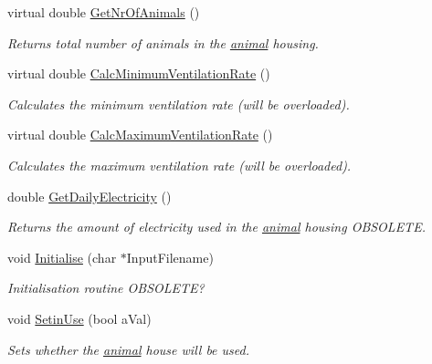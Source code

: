\begin{DoxyCompactItemize}
virtual double \hyperlink{classstable_a09fd313c5cc182435bf0c39f6127a68c}{GetNrOfAnimals} ()
\begin{DoxyCompactList}\small\item\em Returns total number of animals in the \hyperlink{classanimal}{animal} housing. \item\end{DoxyCompactList}\item 
virtual double \hyperlink{classstable_a9bd7855c10c562f9ea785d6ba3608dcc}{CalcMinimumVentilationRate} ()
\begin{DoxyCompactList}\small\item\em Calculates the minimum ventilation rate (will be overloaded). \item\end{DoxyCompactList}\item 
virtual double \hyperlink{classstable_a40ccfa66db782fe4bb8fdcb19ef20f00}{CalcMaximumVentilationRate} ()
\begin{DoxyCompactList}\small\item\em Calculates the maximum ventilation rate (will be overloaded). \item\end{DoxyCompactList}\item 
double \hyperlink{classstable_a44baa21fe350cee62d66a5c3b29b8878}{GetDailyElectricity} ()
\begin{DoxyCompactList}\small\item\em Returns the amount of electricity used in the \hyperlink{classanimal}{animal} housing OBSOLETE. \item\end{DoxyCompactList}\item 
void \hyperlink{classstable_a51684aec61abca5159208fea530f9877}{Initialise} (char $\ast$InputFilename)
\begin{DoxyCompactList}\small\item\em Initialisation routine OBSOLETE? \item\end{DoxyCompactList}\item 
void \hyperlink{classstable_a001595b56aa1e470ed4f54f3df9208ed}{SetinUse} (bool aVal)
\begin{DoxyCompactList}\small\item\em Sets whether the \hyperlink{classanimal}{animal} house will be used. \item\end{DoxyCompactList}\item 

\end{DoxyCompactItemize}
